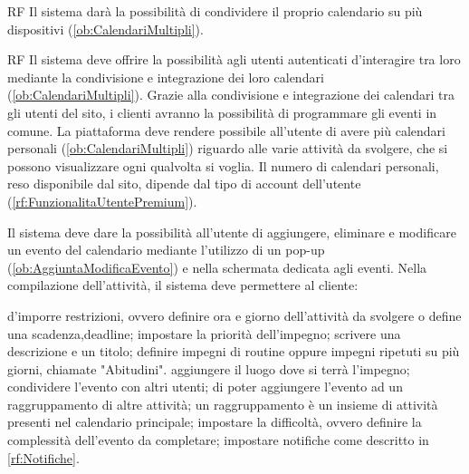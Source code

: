 \begin{listaPersonale}{RF}
	 Il sistema darà la possibilità di condividere il proprio calendario su più dispositivi (\ref{ob:CalendariMultipli}).

	\begin{listaPersonale2}{RF}
		 Il sistema deve offrire la possibilità agli utenti autenticati d'interagire tra loro mediante la condivisione e integrazione dei loro calendari (\ref{ob:CalendariMultipli}). Grazie alla condivisione e integrazione dei calendari tra gli utenti del sito, i clienti avranno la possibilità di programmare gli eventi in comune.
		 La piattaforma deve rendere possibile all'utente di avere più calendari personali (\ref{ob:CalendariMultipli}) riguardo alle varie attività da svolgere, che si possono visualizzare ogni qualvolta si voglia. Il numero di calendari personali, reso disponibile dal sito, dipende dal tipo di account dell'utente (\ref{rf:FunzionalitaUtentePremium}).
	\end{listaPersonale2}

	 Il sistema deve dare la possibilità all'utente di aggiungere, eliminare e modificare un evento del calendario mediante l'utilizzo di un pop-up (\ref{ob:AggiuntaModificaEvento}) e nella schermata dedicata agli eventi. Nella compilazione dell'attività, il sistema deve permettere al cliente:
	\begin{listaPersonale2}{}
		 d'imporre restrizioni, ovvero definire ora e giorno dell'attività da svolgere o define una scadenza,deadline;
		 impostare la priorità dell'impegno;
		 scrivere una descrizione e un titolo;
		 definire impegni di routine oppure impegni ripetuti su più giorni, chiamate "Abitudini".
		 aggiungere il luogo dove si terrà l'impegno;
		 condividere l'evento con altri utenti;
		 di poter aggiungere l'evento ad un raggruppamento di altre attività; un raggruppamento è un insieme di attività presenti nel calendario principale;
		 impostare la difficoltà, ovvero definire la complessità dell'evento da completare;
		 impostare notifiche come descritto in \ref{rf:Notifiche}.
	\end{listaPersonale2}



\end{listaPersonale}

